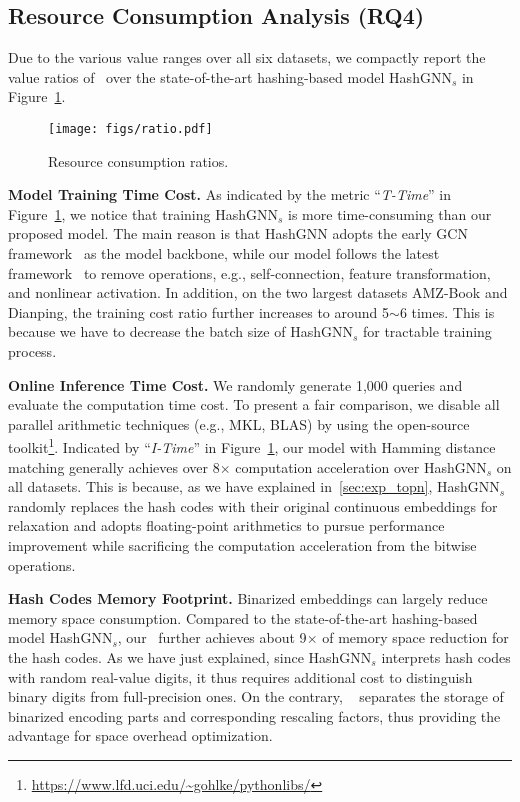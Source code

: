 \subsection{\textbf{Resource Consumption Analysis (RQ4)}}
\label{sec:resource}
Due to the various value ranges over all six datasets, we compactly report the value ratios of \model~over the state-of-the-art hashing-based model HashGNN$_s$ in Figure~\ref{fig:tradeoff}.

\begin{figure}[h]
\begin{minipage}{0.5\textwidth}
\texttt{[image: figs/ratio.pdf]}
\end{minipage} 
\vspace{-0.15in}
\caption{Resource consumption ratios.}
\label{fig:tradeoff}
\end{figure}

{\textbf{Model Training Time Cost.}}
As indicated by the metric ``\textit{T-Time}'' in Figure~\ref{fig:tradeoff}, we notice that training HashGNN$_s$ is more time-consuming than our proposed model.
The main reason is that HashGNN adopts the early GCN framework~\cite{graphsage} as the model backbone, while our model follows the latest framework~\cite{lightgcn} to remove operations, e.g., self-connection, feature transformation, and nonlinear activation.
In addition, on the two largest datasets AMZ-Book and Dianping, the training cost ratio further increases to around 5$\sim$6 times.
This is because we have to decrease the batch size of HashGNN$_s$ for tractable training process.

{\textbf{Online Inference Time Cost.}}
We randomly generate 1,000 queries and evaluate the computation time cost.
To present a fair comparison, we disable all parallel arithmetic techniques (e.g., MKL, BLAS) by using the open-source toolkit\footnote{\url{https://www.lfd.uci.edu/~gohlke/pythonlibs/}}.
Indicated by ``\textit{I-Time}'' in Figure~\ref{fig:tradeoff}, our model with Hamming distance matching generally achieves over 8$\times$ computation acceleration over HashGNN$_s$ on all datasets.
This is because, as we have explained in~\cref{sec:exp_topn}, HashGNN$_s$ randomly replaces the hash codes with their original continuous embeddings for relaxation and adopts floating-point arithmetics to pursue performance improvement while sacrificing the computation acceleration from the bitwise operations.



{\textbf{Hash Codes Memory Footprint.}}
Binarized embeddings can largely reduce memory space consumption.
Compared to the state-of-the-art hashing-based model HashGNN$_s$, our \model~further achieves about 9$\times$ of memory space reduction for the hash codes.
As we have just explained, since HashGNN$_s$ interprets hash codes with random real-value digits, it thus requires additional cost to distinguish binary digits from full-precision ones. 
On the contrary, \model~ separates the storage of binarized encoding parts and corresponding rescaling factors, thus providing the advantage for space overhead optimization.




